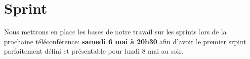 \documentclass[11pt,a4paper,french,twoside,openright]{article}
\begin{document}
\section{Sprint}
Nous mettrons en place les bases de notre travail sur les sprints lors de la prochaine téléconférence: \textbf{samedi 6 mai à 20h30} afin d'avoir le premier srpint parfaitement défini et présentable pour lundi 8 mai au soir.

\label{LastPage}
\end{document}

